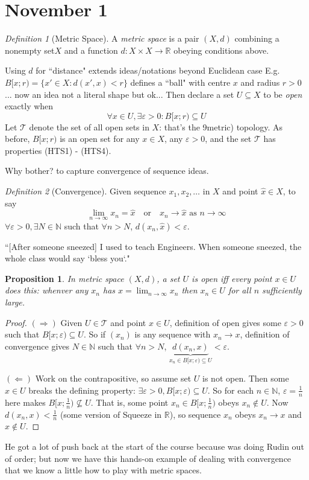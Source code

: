 \documentclass{article}
\theoremstyle{plain}
\newtheorem{proposition}{Proposition}
\theoremstyle{remark}
\newtheorem{definition}{Definition}
\newcommand{\N}{{\mathbb N}}
\newcommand{\R}{{\mathbb R}}
\newcommand{\ep}{{\varepsilon}}
\begin{document}
\section{November 1}
\begin{definition}[Metric Space]
	A \emph{metric space} is a pair $(X,d)$ combining a
	nonempty set$X$ and a function $d \colon X\times X \to \R$
	obeying conditions above.
\end{definition}
Using $d$ for ``distance" extends ideas/notations beyond Euclidean case
E.g. $B[x;r) = \{x' \in X \colon d(x',x)< r\}$ defines a ``ball"
with centre $x$ and radius $r>0$...
now an idea not a literal shape but ok...
Then declare a set $U \subseteq X$ to be \emph{open} exactly when
\[
	\forall x \in U, \exists \ep > 0 \colon B[x;r) \subseteq U
\]
Let $\mathcal{T}$ denote the set of all open sets in $X$:
that's the 9metric) topology.
As before, $B[x;r)$ is an open set for any $x \in X$,
any $\ep > 0$, and the set $\mathcal{T}$ has properties (HTS1) - (HTS4).

Why bother? to capture convergence of sequence ideas.
\begin{definition}[Convergence]
	Given sequence $x_1,x_2, \dots$ in $X$
	and point $\hat{x} \in X$, to say
	\[
		\lim_{n\to\infty} x_n = \hat{x} \quad \text{or}
		\quad x_n \to \hat{x} \text{ as } n \to \infty
	\]
	$\forall \ep > 0, \exists N \in \N$ such that $\forall n > N$, $d(x_n,\hat{x})<\ep$.
\end{definition}
``[After someone sneezed] I used to teach Engineers.
When someone sneezed, the whole class would say `bless you`."

\begin{proposition}
	In metric space $(X,d)$, a set $U$ is open iff every point $x \in U$ does this:
	whenver any $x_n$ has $x = \lim_{n\to\infty} x_n$ then
	$x_n \in U$ for all $n$ sufficiently large.
\end{proposition}
\begin{proof}
	$(\Rightarrow)$ Given $U \in \mathcal{T}$ and point $x \in U$,
	definition of open gives some $\ep > 0$ such that $B[x;\ep) \subseteq U$.
	So if $(x_n)$ is any sequence with $x_n \to x$, definition of
	convergence gives $N \in \N$ such that $\forall n > N$,
	$\underbrace{d(x_n,x)}_{x_n \in B[x;\ep) \subseteq U}< \ep$.

	$(\Leftarrow)$ Work on the contrapositive, so assume set $U$ is not open.
	Then some $x \in U$ breaks the defining property:
	$\exists \ep > 0, B[x;\ep) \subseteq U$.
	So for each $n \in \N$, $\ep=\frac{1}{n}$ here makes $B[x;\frac{1}{n}) \not\subseteq U$.
	That is, some point $x_n \in B[x;\frac{1}{n})$ obeys $x_n \not\in U$.
	Now $d(x_n,x) < \frac{1}{n}$ (some version of Squeeze in $\R$),
	so sequence $x_n$ obeys $x_n \to x$ and $x \not\in U$.
\end{proof}
He got a lot of push back at the start of the course because
was doing Rudin out of order;
but now we have this hands-on example of dealing with convergence
that we know a little how to play with metric spaces.
\end{document}
